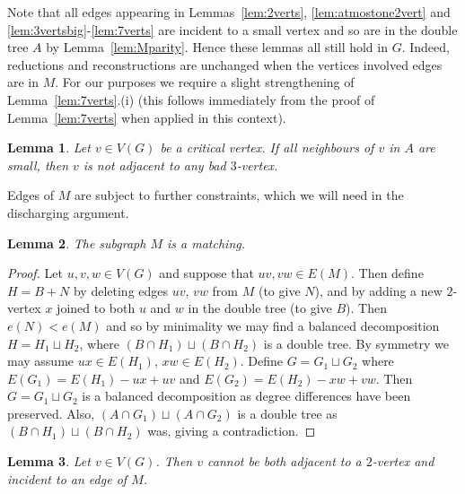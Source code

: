 \documentclass[11pt, reqno, a4paper]{article}
\newtheorem{lemma}{Lemma}[section]
\theoremstyle{definition}
\numberwithin{equation}{section}
\begin{document}
Note that all edges appearing in Lemmas~\ref{lem:2verts}, \ref{lem:atmostone2vert} and \ref{lem:3vertsbig}-\ref{lem:7verts} are incident to a small vertex and so are in the double tree $A$ by Lemma~\ref{lem:Mparity}.
Hence these lemmas all still hold in \(G\).
Indeed, reductions and reconstructions are unchanged when the vertices involved edges are in $M$.
For our purposes we require a slight strengthening of Lemma~\ref{lem:7verts}.(i) (this follows immediately from the proof of Lemma~\ref{lem:7verts} when applied in this context).
\begin{lemma}\label{lem:Mbad} 
Let $v\in V(G)$ be a critical vertex.
If all neighbours of $v$ in $A$ are small, then $v$ is not adjacent to any bad $3$-vertex.
\end{lemma}
Edges of $M$ are subject to further constraints, which we will need in the discharging argument.
\begin{lemma}\label{lem:Mmatching}
The subgraph $M$ is a matching.
\end{lemma}
\begin{proof}
Let $u,v,w\in V(G)$ and suppose that $uv, vw\in E(M)$.
Then define $H = B  + N$ 
by deleting edges $uv$, $vw$ from $M$ (to give $N$), and by adding a new $2$-vertex $x$ joined to both $u$ and $w$ in the double tree (to give $B$).
Then $e(N)<e(M)$ and so by minimality we may find a balanced decomposition $H = H_1 \sqcup H_2$, where $(B\cap H_1) \sqcup (B\cap H_2)$ is a double tree.
By symmetry we may assume $ux \in E( H_1)$, $xw \in E(H_2)$.
Define $G=  G_1\sqcup G_2$ where $E(G_1) = E(H_1) -ux + uv$ and $E(G_2) = E(H_2) - xw + vw$.
Then $G= G_1\sqcup G_2$ is a balanced decomposition as degree differences have been preserved.
Also, $(A\cap G_1)\sqcup (A\cap G_2)$ is a double tree as $(B\cap H_1) \sqcup (B\cap H_2)$ was, giving a contradiction.
\end{proof}
\begin{lemma}\label{lem:M2verts}
Let $v\in V(G)$.
Then $v$ cannot be both adjacent to a $2$-vertex and incident to an edge of $M$.
\end{lemma}
\end{document}
